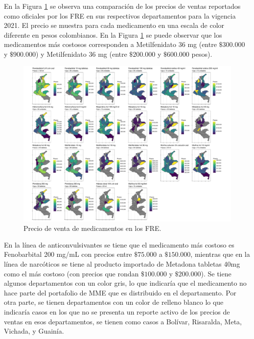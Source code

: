 \documentclass[
]{book}
\begin{document}
En la Figura \ref{fig:precioVentasDepartamentos} se observa una comparación de los precios de ventas reportados como oficiales por los FRE en sus respectivos departamentos para la vigencia 2021. El precio se muestra para cada medicamento en una escala de color diferente en pesos colombianos. En la Figura \ref{fig:precioVentasDepartamentos} se puede observar que los medicamentos más costosos corresponden a Metilfenidato 36 mg (entre \(\$300.000\) y \(\$900.000\)) y Metilfenidato 36 mg (entre \(\$200.000\) y \(\$600.000\) pesos).

\begin{figure}[t!]
\includegraphics[width=1\linewidth]{InformeFinal_files/figure-latex/precioVentasDepartamentos-1} \caption{Precio de venta de medicamentos en los FRE.}\label{fig:precioVentasDepartamentos}
\end{figure}

En la línea de anticonvulsivantes se tiene que el medicamento más costoso es Fenobarbital 200 mg/mL con precios entre \(\$75.000\) a \(\$150.000\), mientras que en la línea de narcóticos se tiene al producto importado de Metadona tabletas 40mg como el más costoso (con precios que rondan \(\$100.000\) y \(\$200.000\)). Se tiene algunos departamentos con un color gris, lo que indicaría que el medicamento no hace parte del portafolio de MME que es distribuido en el departamento. Por otra parte, se tienen departamentos con un color de relleno blanco lo que indicaría casos en los que no se presenta un reporte activo de los precios de ventas en esos departamentos, se tienen como casos a Bolívar, Risaralda, Meta, Vichada, y Guainía.
\end{document}
